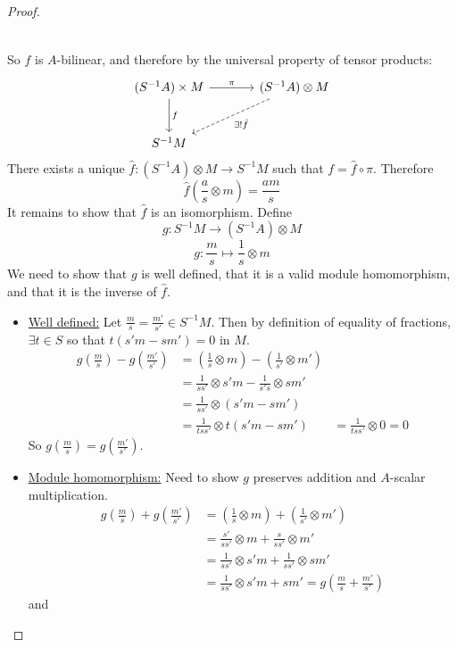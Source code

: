\documentclass[hidelinks,12pt]{article}
\newcommand{\ul}{\underline}
\begin{document}
\begin{proof}
\begin{enumerate}[label=(\roman*).]
\begin{align*}
        \end{align*}
\end{enumerate}
So \(f\) is \(A\)-bilinear, and therefore by the universal property of tensor products:
\[
\begin{tikzcd}[row sep=large,column sep=large]
    (S^{-1}A)\times M \arrow[r, "\pi"] \arrow[d, "f"] & (S^{-1}A)\otimes M \arrow[dl, "\exists !\hat{f}",dashed] \\
S^{-1}M &
\end{tikzcd}
\]
There exists a unique \(\hat{f}:(S^{-1}A)\otimes M\to S^{-1}M\) such that \(f=\hat{f}\circ\pi\). Therefore \[
    \hat{f}\left(\frac{a}{s}\otimes m\right)=\frac{am}{s}
\]
It remains to show that \(\hat{f}\) is an isomorphism. Define \[
g:S^{-1}M\to (S^{-1}A)\otimes M
\]
\[
g:\frac{m}{s}\mapsto \frac{1}{s}\otimes m
\]
We need to show that \(g\) is well defined, that it is a valid module homomorphism, and that it is the inverse of \(\hat{f}\).
\begin{itemize}
    \item \ul{Well defined:} Let \(\frac{m}{s}=\frac{m'}{s'}\in S^{-1}M\). Then by definition of equality of fractions, \(\exists t\in S\) so that \(t(s'm-sm')=0\) in \(M\).
        \begin{align*}
        g\left(\frac{m}{s}\right)-g\left(\frac{m'}{s'}\right)&=\left(\frac{1}{s}\otimes m\right)-\left(\frac{1}{s'}\otimes m'\right)\\
        &=\frac{1}{ss'}\otimes s'm-\frac{1}{s's}\otimes sm'\\
        &=\frac{1}{ss'}\otimes (s'm-sm')\\
        &=\frac{1}{tss'}\otimes t(s'm-sm')
        &=\frac{1}{tss'}\otimes 0=0
        \end{align*}
        So \(g\left(\frac{m}{s}\right)=g\left(\frac{m'}{s'}\right)\).
    \item \ul{Module homomorphism:} Need to show \(g\) preserves addition and \(A\)-scalar multiplication.
        \begin{align*}
        g\left(\frac{m}{s}\right)+g\left(\frac{m'}{s'}\right)&=\left(\frac{1}{s}\otimes m\right)+\left(\frac{1}{s'}\otimes m'\right)\\
        &=\frac{s'}{ss'}\otimes m+\frac{s}{s s'}\otimes m'\\
        &=\frac{1}{s s'}\otimes s'm+\frac{1}{s s'}\otimes sm'\\
        &=\frac{1}{s s'}\otimes s'm+sm'=g\left(\frac{m}{s}+\frac{m'}{s'}\right)
        \end{align*}
        and 

\end{itemize}
\end{proof}
\end{document}
